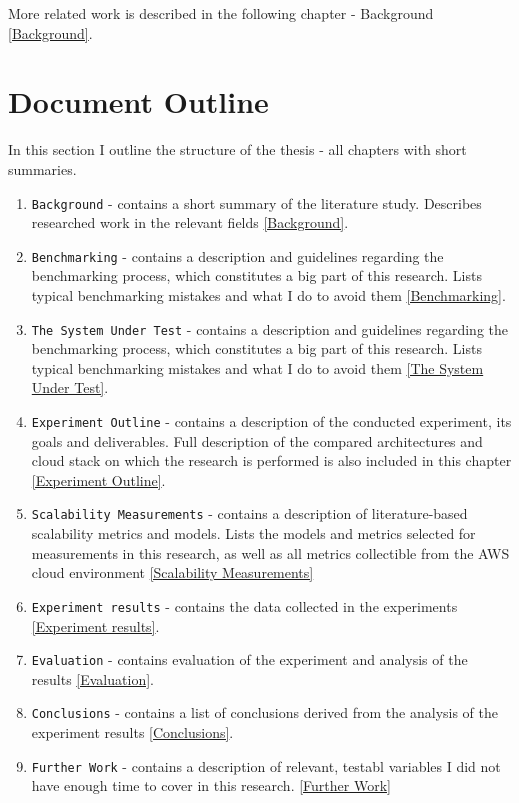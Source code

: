 \documentclass{uvamscse}
\begin{document}
More related work is described in the following chapter - Background \ref{Background}.

\section{Document Outline}
In this section I outline the structure of the thesis - all chapters with short summaries.

\begin{enumerate}
  \item \texttt{Background} - contains a short summary of the literature study. Describes researched work in the relevant fields \ref{Background}.
  \item \texttt{Benchmarking} - contains a description and guidelines regarding the benchmarking process, which constitutes a big part of this research. Lists typical benchmarking mistakes and what I do to avoid them \ref{Benchmarking}.
  \item \texttt{The System Under Test} - contains a description and guidelines regarding the benchmarking process, which constitutes a big part of this research. Lists typical benchmarking mistakes and what I do to avoid them \ref{The System Under Test}.
  \item \texttt{Experiment Outline} - contains a description of the conducted experiment, its goals and deliverables. Full description of the compared architectures and cloud stack on which the research is performed is also included in this chapter \ref{Experiment Outline}.
  \item \texttt{Scalability Measurements} - contains a description of literature-based scalability metrics and models. Lists the models and metrics selected for measurements in this research, as well as all metrics collectible from the AWS cloud environment \ref{Scalability Measurements}
  \item \texttt{Experiment results} - contains the data collected in the experiments \ref{Experiment results}.
  \item \texttt{Evaluation} - contains evaluation of the experiment and analysis of the results \ref{Evaluation}.
  \item \texttt{Conclusions} - contains a list of conclusions derived from the analysis of the experiment results \ref{Conclusions}.
  \item \texttt{Further Work} - contains a description of relevant, testabl variables I did not have enough time to cover in this research. \ref{Further Work}
\end{enumerate}
\end{document}
